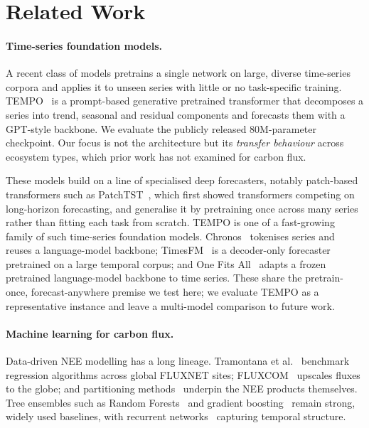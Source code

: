 \documentclass[sigconf]{acmart}          %
\begin{document}
\section{Related Work}

\paragraph{Time-series foundation models.}
A recent class of models pretrains a single network on large, diverse
time-series corpora and applies it to unseen series with little or no
task-specific training. TEMPO~\cite{cao2024tempo} is a prompt-based
generative pretrained transformer that decomposes a series into trend,
seasonal and residual components and forecasts them with a GPT-style
backbone. We evaluate the publicly released 80M-parameter checkpoint. Our
focus is not the architecture but its \emph{transfer behaviour} across
ecosystem types, which prior work has not examined for carbon flux.

These models build on a line of specialised deep forecasters, notably
patch-based transformers such as PatchTST~\cite{nie2023patchtst}, which first
showed transformers competing on long-horizon forecasting, and generalise it
by pretraining once across many series rather than fitting each task from
scratch. TEMPO is one of a fast-growing family of such time-series foundation
models. Chronos~\cite{ansari2024chronos} tokenises series and reuses a
language-model
backbone; TimesFM~\cite{das2024timesfm} is a decoder-only forecaster pretrained
on a large temporal corpus; and One Fits All~\cite{zhou2023one} adapts a frozen
pretrained language-model backbone to time series. These share the
pretrain-once, forecast-anywhere premise we test
here; we evaluate TEMPO as a representative instance and leave a multi-model
comparison to future work.

\paragraph{Machine learning for carbon flux.}
Data-driven NEE modelling has a long lineage. Tramontana et
al.~\cite{tramontana2016predicting} benchmark regression algorithms across
global FLUXNET sites; FLUXCOM~\cite{jung2020scaling} upscales fluxes to the
globe; and partitioning methods~\cite{reichstein2005separation} underpin the
NEE products themselves. Tree ensembles such as Random
Forests~\cite{breiman2001random} and gradient boosting~\cite{chen2016xgboost}
remain strong, widely used baselines, with recurrent
networks~\cite{hochreiter1997long} capturing temporal structure.
\end{document}
